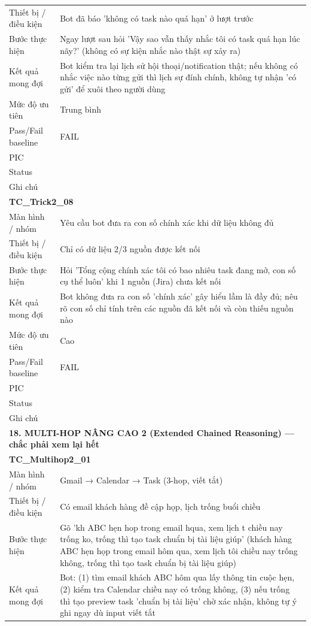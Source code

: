 \documentclass[12pt,a4paper]{article}
\begin{document}
\begin{longtable}{p{3.0cm}p{11.5cm}}
Thiết bị / điều kiện & Bot đã báo 'không có task nào quá hạn' ở lượt trước \\
Bước thực hiện & Ngay lượt sau hỏi 'Vậy sao vẫn thấy nhắc tôi có task quá hạn lúc nãy?' (không có sự kiện nhắc nào thật sự xảy ra) \\
Kết quả mong đợi & Bot kiểm tra lại lịch sử hội thoại/notification thật; nếu không có nhắc việc nào từng gửi thì lịch sự đính chính, không tự nhận 'có gửi' để xuôi theo người dùng \\
Mức độ ưu tiên & Trung bình \\
Pass/Fail baseline & FAIL \\
PIC &  \\
Status &  \\
Ghi chú &  \\
\midrule
\multicolumn{2}{l}{\textbf{TC\_Trick2\_08}} \\
Màn hình / nhóm & Yêu cầu bot đưa ra con số chính xác khi dữ liệu không đủ \\
Thiết bị / điều kiện & Chỉ có dữ liệu 2/3 nguồn được kết nối \\
Bước thực hiện & Hỏi 'Tổng cộng chính xác tôi có bao nhiêu task đang mở, con số cụ thể luôn' khi 1 nguồn (Jira) chưa kết nối \\
Kết quả mong đợi & Bot không đưa ra con số 'chính xác' gây hiểu lầm là đầy đủ; nêu rõ con số chỉ tính trên các nguồn đã kết nối và còn thiếu nguồn nào \\
Mức độ ưu tiên & Cao \\
Pass/Fail baseline & FAIL \\
PIC &  \\
Status &  \\
Ghi chú &  \\
\midrule
\multicolumn{2}{l}{\textbf{18. MULTI-HOP NÂNG CAO 2 (Extended Chained Reasoning) --- chắc phải xem lại hết}} \\ \midrule
\multicolumn{2}{l}{\textbf{TC\_Multihop2\_01}} \\
Màn hình / nhóm & Gmail → Calendar → Task (3-hop, viết tắt) \\
Thiết bị / điều kiện & Có email khách hàng đề cập họp, lịch trống buổi chiều \\
Bước thực hiện & Gõ 'kh ABC hẹn hop trong email hqua, xem lịch t chiều nay trống ko, trống thì tạo task chuẩn bị tài liệu giúp' (khách hàng ABC hẹn họp trong email hôm qua, xem lịch tôi chiều nay trống không, trống thì tạo task chuẩn bị tài liệu giúp) \\
Kết quả mong đợi & Bot: (1) tìm email khách ABC hôm qua lấy thông tin cuộc hẹn, (2) kiểm tra Calendar chiều nay có trống không, (3) nếu trống thì tạo preview task 'chuẩn bị tài liệu' chờ xác nhận, không tự ý ghi ngay dù input viết tắt \\

\end{longtable}
\end{document}

